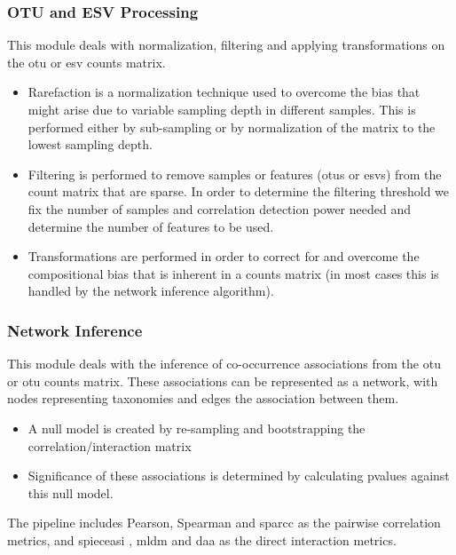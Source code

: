     \subsubsection*{OTU and ESV Processing}
      \vspace{-5mm}
      This module deals with normalization, filtering and applying transformations on the \ac{otu} or \ac{esv} counts matrix.
      \begin{itemize}
        \item Rarefaction is a normalization technique used to overcome the bias that might arise due to variable sampling depth in different samples. This is performed either by sub-sampling or by normalization of the matrix to the lowest sampling depth.
        \item Filtering is performed to remove samples or features (\ac{otu}s or \ac{esv}s) from the count matrix that are sparse. In order to determine the filtering threshold we fix the number of samples and correlation detection power needed  and determine the number of features to be used.
        \item Transformations are performed in order to correct for and overcome the compositional bias that is inherent in a counts matrix (in most cases this is handled by the network inference algorithm).
      \end{itemize}

    \subsubsection*{Network Inference}
      \vspace{-5mm}
      This module deals with the inference of co-occurrence associations from the \ac{otu} or \ac{otu} counts matrix.
      These associations can be represented as a network, with nodes representing taxonomies and edges the association between them.
      \begin{itemize}
        \item A null model is created by re-sampling and bootstrapping the correlation/interaction matrix
        \item Significance of these associations is determined by calculating pvalues against this null model.
      \end{itemize}
      The pipeline includes Pearson, Spearman and \ac{sparcc} \cite{Friedman2012} as the pairwise correlation metrics, and \ac{spieceasi} \cite{Kurtz2015}, \ac{mldm} \cite{Yang2017} and \ac{daa} \cite{Menon2018} as the direct interaction metrics.

